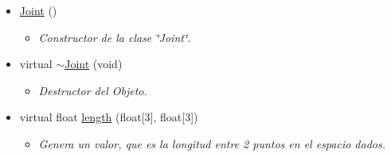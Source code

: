 \begin{itemize}
\item 
\hypertarget{class_joint_a79a7a4715b2166714e039d7c7c5ea3b4}{\hyperlink{class_joint_a79a7a4715b2166714e039d7c7c5ea3b4}{\-Joint} ()}\label{class_joint_a79a7a4715b2166714e039d7c7c5ea3b4}

\begin{itemize}\small\item\em \-Constructor de la clase \char`\"{}\-Joint\char`\"{}. \end{itemize}\item 
\hypertarget{class_joint_ac9749eeeac49e9861554f2d580cc020d}{virtual \hyperlink{class_joint_ac9749eeeac49e9861554f2d580cc020d}{$\sim$\-Joint} (void)}\label{class_joint_ac9749eeeac49e9861554f2d580cc020d}

\begin{itemize}\small\item\em \-Destructor del \-Objeto. \end{itemize}\item 
virtual float \hyperlink{class_joint_a1b4c78e285a1d96bbde889d4979828fa}{length} (float\mbox{[}3\mbox{]}, float\mbox{[}3\mbox{]})
\begin{itemize}\small\item\em \- Genera un valor, que es la longitud entre 2 puntos en el espacio dados.


\end{itemize}
\end{itemize}
